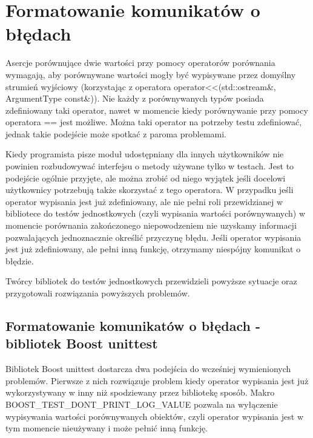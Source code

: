\documentclass[12pt,a4paper,notitlepage]{report}
\begin{document}
\chapter{Formatowanie komunikatów o błędach}

Asercje porównujące dwie wartości przy pomocy operatorów porównania wymagają, aby porównywane wartości mogły być wypisywane przez domyślny strumień wyjściowy (korzystając z operatora operator<<(std::ostream\&, ArgumentType const\&)). 
Nie każdy z porównywanych typów posiada zdefiniowany taki operator, nawet w momencie kiedy porównywanie przy pomocy operatora == jest możliwe. Można taki operator na potrzeby testu zdefiniować, jednak takie podejście może spotkać z paroma problemami.

Kiedy programista pisze moduł udostępniany dla innych użytkowników nie powinien rozbudowywać interfejsu o metody używane tylko w testach. Jest to podejście ogólnie przyjęte, ale można zrobić od niego wyjątek jeśli docelowi użytkownicy potrzebują także skorzystać z tego operatora.
W przypadku jeśli operator wypisania jest już zdefiniowany, ale nie pełni roli przewidzianej w bibliotece do testów jednostkowych (czyli wypisania wartości porównywanych) w momencie porównania zakończonego niepowodzeniem nie uzyskamy informacji pozwalających jednoznacznie określić przyczynę błędu.
Jeśli operator wypisania jest już zdefiniowany, ale pełni inną funkcję, otrzymamy niespójny komunikat o błędzie.

Twórcy bibliotek do testów jednostkowych przewidzieli powyższe sytuacje oraz przygotowali rozwiązania powyższych problemów.

\section{Formatowanie komunikatów o błędach - bibliotek Boost unittest}

Bibliotek Boost unittest dostarcza dwa podejścia do wcześniej wymienionych problemów.
Pierwsze z nich rozwiązuje problem kiedy operator wypisania jest już wykorzystywany w inny niż spodziewany przez bibliotekę sposób. Makro BOOST{\_}TEST{\_}DONT{\_}PRINT{\_}LOG{\_}VALUE pozwala na wyłączenie wypisywania wartości porównywanych obiektów, czyli operator wypisania jest w tym momencie nieużywany i może pełnić inną funkcję.

			
\end{document}
